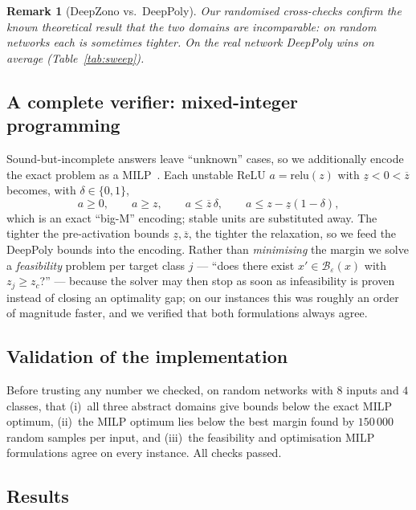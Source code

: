 \documentclass[11pt,a4paper]{article}
\newcommand{\eps}{\varepsilon}
\newcommand{\B}{\mathcal{B}}
\newcommand{\lb}[1]{\underline{#1}}
\newcommand{\ub}[1]{\overline{#1}}
\newtheorem{remark}{Remark}
\begin{document}
\begin{remark}[DeepZono vs.\ DeepPoly]
Our randomised cross-checks confirm the known theoretical result that the two
domains are \emph{incomparable}: on random networks each is sometimes tighter.
On the real network DeepPoly wins on average (Table~\ref{tab:sweep}).
\end{remark}

\subsection{A complete verifier: mixed-integer programming}
Sound-but-incomplete answers leave ``unknown'' cases, so we additionally encode
the exact problem as a MILP~\cite{tjeng2019}. Each unstable ReLU
$a=\mathrm{relu}(z)$ with $\lb{z}<0<\ub{z}$ becomes, with $\delta\in\{0,1\}$,
\begin{equation}
a\ge 0,\qquad a\ge z,\qquad a\le \ub{z}\,\delta,\qquad a\le z-\lb{z}(1-\delta),
\end{equation}
which is an exact ``big-M'' encoding; stable units are substituted away. The
tighter the pre-activation bounds $\lb{z},\ub{z}$, the tighter the relaxation, so
we feed the DeepPoly bounds into the encoding. Rather than \emph{minimising} the
margin we solve a \emph{feasibility} problem per target class $j$ --- ``does
there exist $x'\in\B_\eps(x)$ with $z_j\ge z_c$?'' --- because the solver may
then stop as soon as infeasibility is proven instead of closing an optimality
gap; on our instances this was roughly an order of magnitude faster, and we
verified that both formulations always agree.

\subsection{Validation of the implementation}
Before trusting any number we checked, on random networks with $8$ inputs and
$4$ classes, that (i)~all three abstract domains give bounds below the exact
MILP optimum, (ii)~the MILP optimum lies below the best margin found by
$150\,000$ random samples per input, and (iii)~the feasibility and optimisation
MILP formulations agree on every instance. All checks passed.

\subsection{Results}
\end{document}
